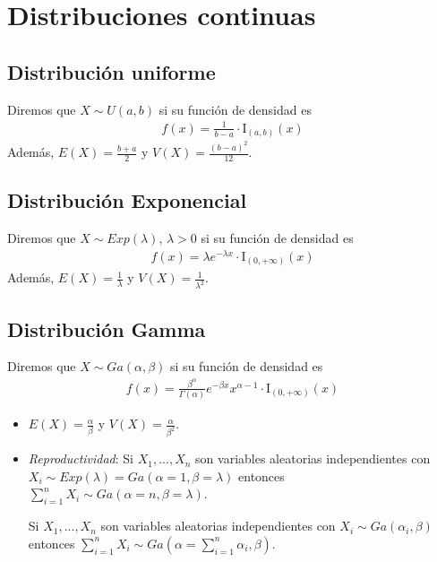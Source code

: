 \section{Distribuciones continuas}

\subsection{Distribución uniforme}
Diremos que $X \sim U(a,b)$ si su función de densidad es
\begin{align*}
    f(x) = \frac{1}{b-a} \cdot \text{I}_{(a,b)}(x)
\end{align*}
Además, $E(X) = \frac{b+a}{2}$ y $V(X) = \frac{(b-a)^2}{12}$.

\subsection{Distribución Exponencial}
Diremos que $X \sim Exp(\lambda)$, $\lambda > 0$ si su función de densidad es
\begin{align*}
    f(x) = \lambda e^{-\lambda x} \cdot \text{I}_{(0,+\infty)}(x)
\end{align*}
Además, $E(X) = \frac{1}{\lambda}$ y $V(X) = \frac{1}{\lambda^2}$.

\subsection{Distribución Gamma}

Diremos que $X \sim Ga(\alpha, \beta)$ si su función de densidad es
\begin{align*}
    f(x) = \frac{\beta^{\alpha}}{\Gamma(\alpha)}e^{-\beta x}x^{\alpha - 1} \cdot \text{I}_{(0,+\infty)}(x)
\end{align*}

\begin{itemize}
    \item $E(X) = \frac{\alpha}{\beta}$ y $V(X) = \frac{\alpha}{\beta^2}$.
    \item \textit{Reproductividad}: Si $X_1,...,X_n$ son variables aleatorias independientes con $X_i \sim Exp(\lambda) = Ga(\alpha = 1, \beta = \lambda)$ entonces $\sum_{i=1}^{n}{X_i} \sim Ga(\alpha = n, \beta = \lambda)$.

          Si $X_1,...,X_n$ son variables aleatorias independientes con $X_i \sim Ga(\alpha_i, \beta)$ entonces $\sum_{i=1}^{n}{X_i} \sim Ga\left(\alpha = \sum_{i=1}^{n}{\alpha_i}, \beta \right)$.
\end{itemize}

